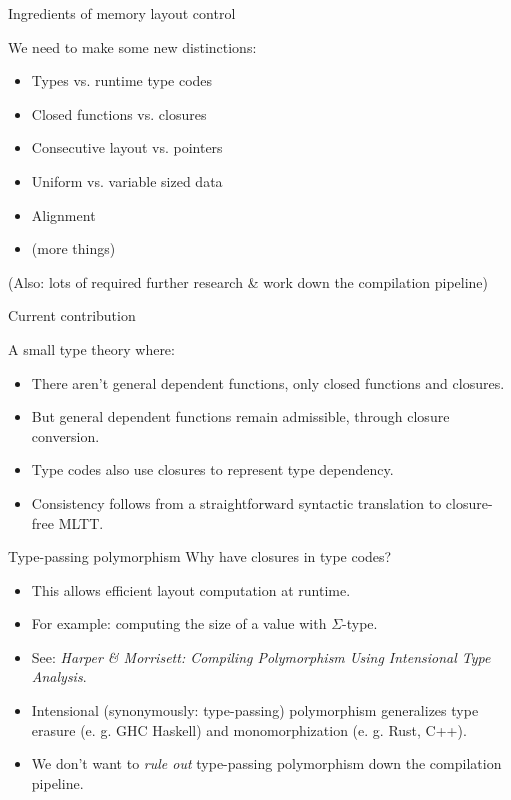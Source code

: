 \documentclass{beamer}
\begin{document}
\begin{frame}{Ingredients of memory layout control}

  We need to make some new distinctions:

  \begin{itemize}
  \item {\color{red} Types vs. runtime type codes}
  \item {\color{red} Closed functions vs. closures}
  \item Consecutive layout vs. pointers
  \item Uniform vs. variable sized data
  \item Alignment
  \item (more things)
  \end{itemize}
(Also: lots of required further research \& work down the compilation pipeline)
\end{frame}

\begin{frame}{Current contribution}

  A small type theory where:
  \begin{itemize}
  \item There aren't general dependent functions, only closed functions and closures.
  \item But general dependent functions remain admissible, through closure conversion.
  \item Type codes also use closures to represent type dependency.
  \item Consistency follows from a straightforward syntactic translation to closure-free
        MLTT.
  \end{itemize}
\end{frame}


\begin{frame}{Type-passing polymorphism}
Why have closures in type codes?

  \begin{itemize}
  \item
  This allows efficient layout computation at runtime.
  \item
  For example: computing the size of a value with $\Sigma$-type.
  \item
  See: \emph{Harper \& Morrisett: Compiling Polymorphism Using Intensional Type Analysis}.
  \item
    Intensional (synonymously: type-passing) polymorphism generalizes type erasure (e. g. GHC Haskell) and monomorphization (e. g. Rust, C++).
  \item
  We don't want to \emph{rule out} type-passing polymorphism down the compilation pipeline.
  \end{itemize}

\end{frame}
\end{document}
